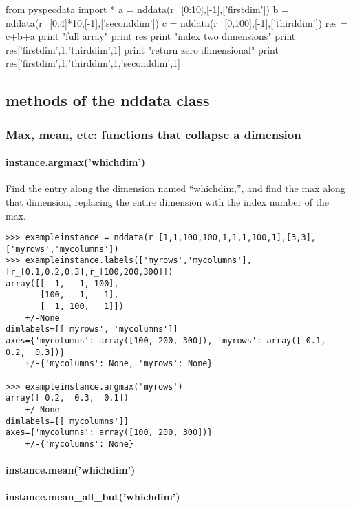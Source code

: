 

\begin{python}
from pyspecdata import *
a = nddata(r_[0:10],[-1],['firstdim'])
b = nddata(r_[0:4]*10,[-1],['seconddim'])
c = nddata(r_[0,100],[-1],['thirddim'])
res = c+b+a
print "full array"
print res
print "index two dimensions"
print res['firstdim',1,'thirddim',1]
print "return zero dimensional"
print res['firstdim',1,'thirddim',1,'seconddim',1]
\end{python}
\subsection{methods of the nddata class}
\subsubsection{Max, mean, etc: functions that collapse a dimension}
\paragraph{instance.argmax('whichdim')}
Find the entry along the dimension named ``whichdim,'', and find the max along that dimension, replacing the entire dimension with the index number of the max.

\begin{lstlisting}
>>> exampleinstance = nddata(r_[1,1,100,100,1,1,1,100,1],[3,3],['myrows','mycolumns'])
>>> exampleinstance.labels(['myrows','mycolumns'],[r_[0.1,0.2,0.3],r_[100,200,300]])
array([[  1,   1, 100],
       [100,   1,   1],
       [  1, 100,   1]])
    +/-None
dimlabels=[['myrows', 'mycolumns']]
axes={'mycolumns': array([100, 200, 300]), 'myrows': array([ 0.1,  0.2,  0.3])}
    +/-{'mycolumns': None, 'myrows': None}

>>> exampleinstance.argmax('myrows')
array([ 0.2,  0.3,  0.1])
    +/-None
dimlabels=[['mycolumns']]
axes={'mycolumns': array([100, 200, 300])}
    +/-{'mycolumns': None}

\end{lstlisting}
\paragraph{instance.mean('whichdim')}
\paragraph{instance.mean\_all\_but('whichdim')}
